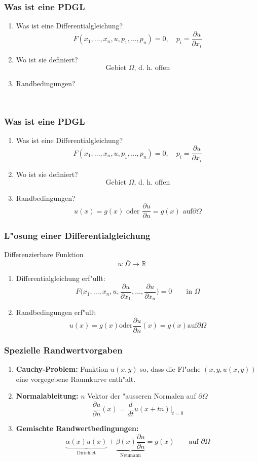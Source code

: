 \documentclass{beamer}
\begin{document}
\begin{frame}
\frametitle{Was ist eine PDGL}
\begin{enumerate}
\item Was ist eine Differentialgleichung?
\[
F( x_1,\dots,x_n,u,p_1, \dots,p_n) =0,\quad p_i=\frac{\partial u}{\partial x_i}
\]
\item Wo ist sie definiert?
\[
\text{Gebiet $\Omega$, d.~h.~offen}
\]
\item Randbedingungen?
\[
\phantom{
\text{$u(x)=g(x)$ oder $\frac{\partial u}{\partial n}=g(x)$ auf
$\partial\Omega$}
}
\]
\end{enumerate}
\end{frame}

\begin{frame}
\frametitle{Was ist eine PDGL}
\begin{enumerate}
\item Was ist eine Differentialgleichung?
\[
F( x_1,\dots,x_n,u,p_1, \dots,p_n) =0,\quad p_i=\frac{\partial u}{\partial x_i}
\]
\item Wo ist sie definiert?
\[
\text{Gebiet $\Omega$, d.~h.~offen}
\]
\item Randbedingungen?
\[
\text{$u(x)=g(x)$ oder $\frac{\partial u}{\partial n}=g(x)$ auf
$\partial\Omega$}
\]
\end{enumerate}
\end{frame}

\begin{frame}
\frametitle{L"osung einer Differentialgleichung}
Differenzierbare Funktion
\[
u\colon \bar\Omega\to\mathbb R
\]
\pause
\begin{enumerate}
\item Differentialgleichung erf"ullt:
\[
F\biggl(x_1,\dots,x_n,u,
\frac{\partial u}{\partial x_1},\dots, \frac{\partial u}{\partial x_n}
\biggr)=0\qquad\text{in $\Omega$}
\]
\pause
\item Randbedingungen erf"ullt
\[
\text{
$u(x)=g(x)$
oder
$\frac{\partial u}{\partial n}(x)=g(x)$
auf
$\partial\Omega$
}
\]
\end{enumerate}
\end{frame}

\begin{frame}
\frametitle{Spezielle Randwertvorgaben}
\begin{enumerate}
\item {\bf Cauchy-Problem:}
\pause
Funktion $u(x,y)$ so, dass die Fl"ache $(x,y,u(x,y))$ eine vorgegebene
Raumkurve enth"alt.
\medskip

\pause
\item {\bf Normalableitung:}
\pause
$n$ Vektor der "ausseren Normalen auf $\partial\Omega$
\[
\frac{\partial u}{\partial n}(x)
=
\frac{d}{dt}u(x+tn)\bigg|_{t=0}
\]
\pause
\item {\bf Gemischte Randwertbedingungen:}
\pause
\[
\underbrace{
\alpha(x) u(x)
}_{\text{Dirichlet}}
+
\underbrace{
\beta(x)\frac{\partial u}{\partial n}
}_{\text{Neumann}}
= g(x) 
\qquad
\text{auf $\partial\Omega$}
\]
\end{enumerate}
\end{frame}
\end{document}
